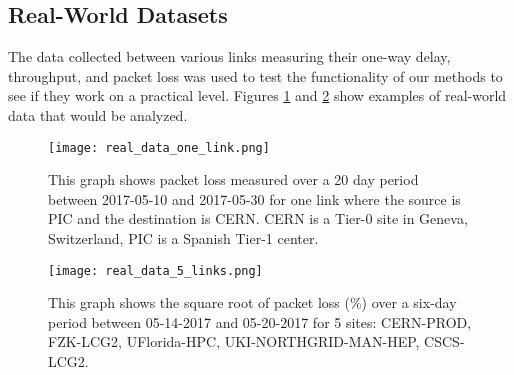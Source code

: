 \documentclass[5p]{elsarticle}
\begin{document}
\begin{table}[htbp]
\centering
\caption{The time period and features affected for each anomaly generated by the simulated data. Feature numbers were listed in descending order of significance towards the data.}
\label{table:aintervals}
\end{table}




\subsection{Real-World Datasets}

The data collected between various links measuring their one-way delay, throughput, and packet loss was used to test the functionality of our methods to see if they work on a practical level. Figures \ref{fig:real_one} and \ref{fig:real_five} show examples of real-world data that would be analyzed.
\begin{figure}[htbp]
    \centering
    \texttt{[image: real\_data\_one\_link.png]}
    \caption{This graph shows packet loss measured over a 20 day period between 2017-05-10 and 2017-05-30 for one link where the source is PIC and the destination is CERN. CERN is a Tier-0 site in Geneva, Switzerland, PIC is a Spanish Tier-1 center.}
    \label{fig:real_one}
\end{figure}
\begin{figure}[htbp]
    \centering
    \texttt{[image: real\_data\_5\_links.png]}
    \caption{This graph shows the square root of packet loss (\%)  over a six-day period between 05-14-2017 and 05-20-2017 for 5 sites: CERN-PROD, FZK-LCG2, UFlorida-HPC, UKI-NORTHGRID-MAN-HEP, CSCS-LCG2.}
    \label{fig:real_five}
\end{figure}
\end{document}
